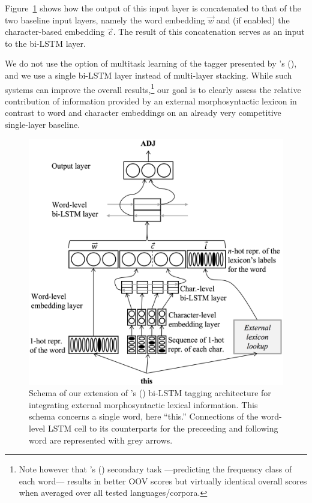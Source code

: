 \documentclass[11pt,letterpaper]{article}
\begin{document}
Figure~\ref{fig:schema} shows how the output of this input layer is concatenated to that of the two baseline input
layers, namely the word embedding $\vec{w}$ and (if enabled) the character-based embedding $\vec{c}$. The result of this
concatenation serves as an input to the bi-LSTM layer.

We do not use the option of multitask learning of the tagger presented by \citeauthor{plank16}'s
(\citeyear{plank16}), and we use a single bi-LSTM layer instead of multi-layer stacking. While such systems can
improve the overall results,\footnote{Note however that \citeauthor{plank16}'s (\citeyear{plank16})
    secondary task ---predicting the frequency class of each word--- results in better OOV scores but virtually identical
    overall scores when averaged over all tested languages/corpora.} our goal is to clearly assess the relative
contribution of information provided by an external morphosyntactic lexicon in contrast to word and character embeddings
on an already very competitive single-layer baseline.

\begin{figure}
\includegraphics[width=\columnwidth]{emnlp17schemaB2}
\caption{Schema of our extension of \citeauthor{plank16}'s (\citeyear{plank16})
  bi-LSTM tagging architecture for integrating external morphosyntactic lexical information. This schema concerns a
  single word, here ``this.'' Connections of the word-level LSTM cell to its counterparts for the preceeding and
  following word are represented with grey arrows.}\label{fig:schema}
\end{figure}
\end{document}
